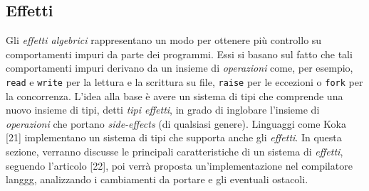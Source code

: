 \documentclass[10pt,a4paper]{article}
\begin{document}
\subsection{Effetti}
Gli \textit{effetti algebrici} rappresentano un modo per ottenere più controllo su comportamenti impuri da parte dei
programmi. Essi si basano sul fatto che tali comportamenti impuri derivano da un insieme di \textit{operazioni} come,
per esempio, \texttt{read} e \texttt{write} per la lettura e la scrittura su file, \texttt{raise} per le eccezioni o
\texttt{fork} per la concorrenza.
L'idea alla base è avere un sistema di tipi che comprende una nuovo insieme di tipi, detti \textit{tipi effetti}, in
grado di inglobare l'insieme di \textit{operazioni} che portano \textit{side-effects} (di qualsiasi genere). Linguaggi
come Koka [21] implementano un sistema di tipi che supporta anche gli \textit{effetti}. In questa sezione, verranno
discusse le principali caratteristiche di un sistema di \textit{effetti}, seguendo l'articolo [22], poi verrà proposta
un'implementazione nel compilatore langgg, analizzando i cambiamenti da portare e gli eventuali ostacoli.
\end{document}
